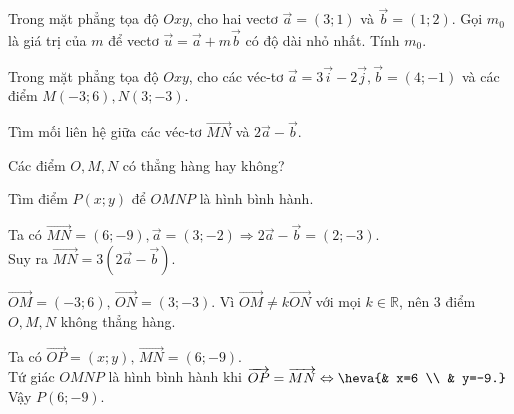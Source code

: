 \begin{bt}%
	Trong mặt phẳng tọa độ $Oxy$, cho hai vectơ $\overrightarrow{a}=(3;1)$ và $\overrightarrow{b}=(1;2)$. Gọi $m_0$ là giá trị của $m$ để vectơ $\overrightarrow{u}=\overrightarrow{a}+m\overrightarrow{b}$ có độ dài nhỏ nhất. Tính $m_0$.
\end{bt}

\begin{bt}%
	Trong mặt phẳng tọa độ $Oxy$, cho các véc-tơ $\overrightarrow{a}=3\overrightarrow{i}-2\overrightarrow{j}, \overrightarrow{b}=(4;-1)$ và các điểm $M(-3;6), N(3;-3)$.
	\begin{listEX}[1]
		\item Tìm mối liên hệ giữa các véc-tơ $\overrightarrow{MN}$ và $2\overrightarrow{a}-\overrightarrow{b}$.
		\item Các điểm $O,M,N$ có thẳng hàng hay không?
		\item Tìm điểm $P(x;y)$ để $OMNP$ là hình bình hành.
	\end{listEX}
	\loigiai
	{
		\begin{listEX}[1]
			\item Ta có $\overrightarrow{MN}=(6;-9), 
			\overrightarrow{a}=(3;-2)\Rightarrow 2\overrightarrow{a}-\overrightarrow{b}=(2;-3)$.\\
			Suy ra $\overrightarrow{MN} =3(2\overrightarrow{a}-\overrightarrow{b})$.
			\item $\overrightarrow{OM} =(-3;6),\, \overrightarrow{ON}=(3;-3)$. Vì $\overrightarrow{OM}\ne k\overrightarrow{ON}$ với mọi $k\in\mathbb{R}$, nên 3 điểm $O,M,N$ không thẳng hàng.
			\item Ta có $\overrightarrow{OP}=(x;y),\, \overrightarrow{MN}=(6;-9)$.\\ Tứ giác $OMNP$ là hình bình hành khi $\overrightarrow{OP}=\overrightarrow{MN}\Leftrightarrow \heva{& x=6 \\ & y=-9.}$\\
			Vậy $P(6;-9)$.
		\end{listEX}
	}
\end{bt}

